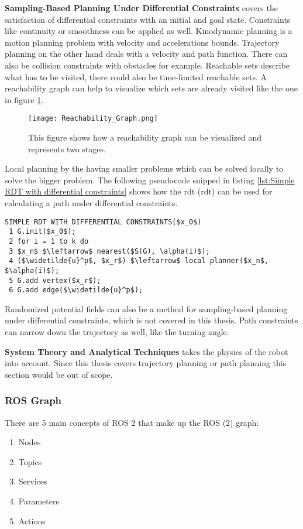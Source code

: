 \textbf{Sampling-Based Planning Under Differential Constraints} covers the satisfaction of differential constraints with an initial and goal state. Constraints like continuity or smoothness can be applied as well. Kinodynamic planning is a motion planning problem with velocity and accelerations bounds. Trajectory planning on the other hand deals with a velocity and path function. There can also be collision constraints with obstacles for example.
Reachable sets describe what has to be visited, there could also be time-limited reachable sets. A reachability graph can help to visualize which sets are already visited like the one in figure \ref{fig:Reachability Graph}.
\begin{figure}[H]
    \centering
    \texttt{[image: Reachability\_Graph.png]}
    \caption{This figure shows how a reachability graph can be visualized and represents two stages. \cite{planning_algorithms_steven_m_lavalle}}
    \label{fig:Reachability Graph}
\end{figure}
Local planning by the having smaller problems which can be solved locally to solve the bigger problem. The following pseudocode snipped in listing \ref{lst:Simple RDT with differential constraints} shows how the \acrlong{rdt} (\acrshort{rdt}) can be used for calculating a path under differential constraints.
\begin{lstlisting}[mathescape=true, caption={The local planning method computes $x_r$. A new vertex will be available: $x_r$. \cite{planning_algorithms_steven_m_lavalle}}, label={lst:Simple RDT with differential constraints}]
SIMPLE RDT WITH DIFFERENTIAL CONSTRAINTS($x_0$)
 1 G.init($x_0$);
 2 for i = 1 to k do
 3 $x_n$ $\leftarrow$ nearest($S(G), \alpha(i)$);
 4 ($\widetilde{u}^p$, $x_r$) $\leftarrow$ local planner($x_n$, $\alpha(i)$);
 5 G.add vertex($x_r$);
 6 G.add edge($\widetilde{u}^p$);
\end{lstlisting}
Randomized potential fields can also be a method for sampling-based planning under differential constraints, which is not covered in this thesis. Path constraints can narrow down the trajectory as well, like the turning angle. \cite{planning_algorithms_steven_m_lavalle}

\textbf{System Theory and Analytical Techniques} takes the physics of the robot into account. Since this thesis covers trajectory planning or path planning this section would be out of scope. \cite{planning_algorithms_steven_m_lavalle}

\subsubsection{ROS Graph} \label{sec:ROS Graph}
There are 5 main concepts of ROS 2 that make up the ROS (2) graph:
\begin{enumerate}
    \item Nodes
    \item Topics
    \item Services
    \item Parameters
    \item Actions
\end{enumerate}

